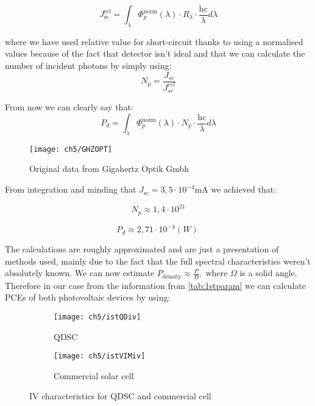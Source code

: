 \begin{equation}
J_{\text{sc}}^{\text{rel}} = \int_{\lambda}^{}{\Phi_{p}^{\text{norm}}\left( \lambda \right) \cdot R_{\lambda} \cdot \frac{\text{hc}}{\lambda}d\lambda }
\end{equation}


 where we have used relative value for short-circuit thanks to using a
normalised values because of the fact that detector isn't ideal and that
we can calculate the number of incident photons by simply using:
\begin{equation}
N_{p} = \frac{J_{sc}}{J_{sc}^{rel}}
\end{equation}

 From now we can clearly say that:
\begin{equation}
P_{d} = \int_{\lambda}^{}{\Phi_{p}^{\text{norm}}\left( \lambda \right) \cdot N_{p} \cdot \frac{\text{hc}}{\lambda}d \lambda }
\end{equation}

\begin{figure}[H]
\center
\texttt{[image: ch5/GHZOPT]}
\caption{Original data from Gigahertz Optik Gmbh}
\end{figure}

 From integration and minding that
\(J_{\text{sc}} = 3,5 \cdot 10^{- 4}\text{mA\ }\)we achieved that:

\[N_{p} \approx 1,4 \cdot 10^{21}\]

\[P_{d} \approx 2,71 \cdot 10^{-4} \left( W \right)\ \]

 The calculations are roughly approximated and are just a
presentation of methods used, mainly due to the fact that the full
spectral characteristics weren't absolutely known. We can now estimate
\(P_{\text{density}} \approx \frac{P}{\Omega},\) where \(\Omega\) is a
solid angle. Therefore in our case from the information from \ref{tab:1stparam} we can calculate PCEs of both
photovoltaic devices by using:
\begin{figure}[b]
	\centering
	\begin{subfigure}[b]{0.49\textwidth}
	\centering
	\texttt{[image: ch5/istQDiv]}
	\caption{QDSC}
	\end{subfigure}
	\hfill
	\begin{subfigure}[b]{0.49\textwidth}
	\centering
	\texttt{[image: ch5/istVIMiv]}
	\caption{Commercial solar cell}{}
	\end{subfigure}
	\caption{IV characteristics for QDSC and commercial cell }
\end{figure}

